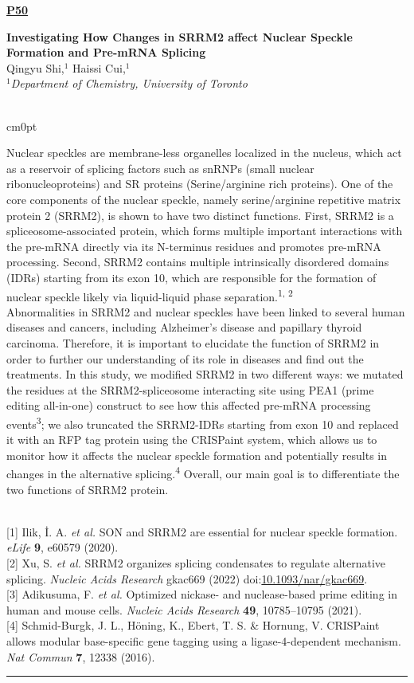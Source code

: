 \documentclass[titlepage,oneside,openany,10pt]{book}
\newenvironment{posterabswrefwfig}[8] %
        {
        \newcommand{\posterref}{#5}
	\FPeval{\cutw}{clip(16.7-#7)}
	\FPeval{\cutl}{round(#8/0.35+1,3)}
	\begin{flushright}
                \underline{\textbf{#4}}
        \end{flushright}
        \textbf{#1}\\%
        #2\\%
        \textit{#3}\\\\%
        \def\windowpagestuff{\centering
                \texttt{[image: \#6]}
	}
        \opencutright
        \begin{cutout}{0}{\cutw cm}{0pt}{\RoundingUpFunction{\cutl}}
        \noindent
	}
	{
	\end{cutout}
	\vspace{0.5cm}
	\\\noindent \posterref \\ \noindent\rule{15cm}{0.5pt}%
        }
\begin{document}
\newpage

\begin{posterabswrefwfig}
    {Investigating How Changes in SRRM2 affect Nuclear Speckle Formation and Pre-mRNA Splicing}
    {Qingyu Shi,$^{1}$ Haissi Cui,$^{1}$}
    {
    $^1$Department of Chemistry, University of Toronto
    }
    {P50}
    {
    {[1]} Ilik, İ. A. \emph{et al.} SON and SRRM2 are essential for nuclear speckle formation. \emph{eLife}  \textbf{9}, e60579 (2020).\\
    {[2]} Xu, S. \emph{et al.} SRRM2 organizes splicing condensates to regulate alternative splicing. \emph{Nucleic Acids Research} gkac669 (2022) doi:\href{https://doi.org/10.1093/nar/gkac669}{10.1093/nar/gkac669}.\\
    {[3]} Adikusuma, F. \emph{et al.} Optimized nickase- and nuclease-based prime editing in human and mouse cells. \emph{Nucleic Acids Research}  \textbf{49}, 10785--10795 (2021).\\
    {[4]} Schmid-Burgk, J. L., H\"{o}ning, K., Ebert, T. S. \& Hornung, V. CRISPaint allows modular base-specific gene tagging using a ligase-4-dependent mechanism. \emph{Nat Commun}  \textbf{7}, 12338 (2016).
    }
    {abstract_figures/Shi_Qingyu_Poster.png}
    {10.0}
    {10.0}
    Nuclear speckles are membrane-less organelles localized in the nucleus, which act as a reservoir of splicing factors such as snRNPs (small nuclear ribonucleoproteins) and SR proteins (Serine/arginine rich proteins). One of the core components of the nuclear speckle, namely serine/arginine repetitive matrix protein 2 (SRRM2), is shown to have two distinct functions. First, SRRM2 is a spliceosome-associated protein, which forms multiple important interactions with the pre-mRNA directly via its N-terminus residues and promotes pre-mRNA processing. Second, SRRM2 contains multiple intrinsically disordered domains (IDRs) starting from its exon 10, which are responsible for the formation of nuclear speckle likely via liquid-liquid phase separation.\textsuperscript{1, 2}\\Abnormalities in SRRM2 and nuclear speckles have been linked to several human diseases and cancers, including Alzheimer's disease and papillary thyroid carcinoma. Therefore, it is important to elucidate the function of SRRM2 in order to further our understanding of its role in diseases and find out the treatments. In this study, we modified SRRM2 in two different ways: we mutated the residues at the SRRM2-spliceosome interacting site using PEA1 (prime editing all-in-one) construct to see how this affected pre-mRNA processing events\textsuperscript{3}; we also truncated the SRRM2-IDRs starting from exon 10 and replaced it with an RFP tag protein using the CRISPaint system, which allows us to monitor how it affects the nuclear speckle formation and potentially results in changes in the alternative splicing.\textsuperscript{4} Overall, our main goal is to differentiate the two functions of SRRM2 protein.
    \label{ShiQ}
\end{posterabswrefwfig}
\end{document}
